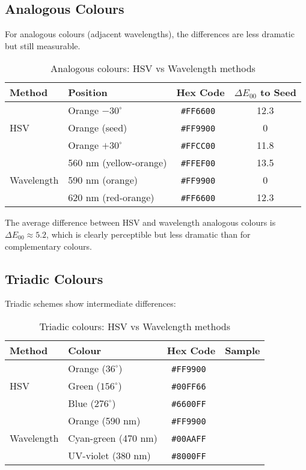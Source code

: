 \documentclass[12pt,a4paper]{article}
\newcommand{\deltaE}{\Delta E_{00}}
\newcommand{\hexcolour}[1]{%
  \definecolor{tempcolour}{HTML}{#1}%
  \texttt{\##1}~\raisebox{0.2ex}{\fboxsep=0pt\fbox{\colorbox{tempcolour}{\phantom{XX}}}}%
}
\begin{document}
\subsection{Analogous Colours}

For analogous colours (adjacent wavelengths), the differences are less dramatic but still measurable.

\begin{table}[ht]
\centering
\caption{Analogous colours: HSV vs Wavelength methods}
\label{tab:analogous}
\begin{tabular}{llcc}
\toprule
\textbf{Method} & \textbf{Position} & \textbf{Hex Code} & \textbf{$\deltaE$ to Seed} \\
\midrule
\multirow{3}{*}{HSV} & Orange $- 30^\circ$ & \hexcolour{FF6600} & 12.3 \\
& Orange (seed) & \hexcolour{FF9900} & 0 \\
& Orange $+ 30^\circ$ & \hexcolour{FFCC00} & 11.8 \\
\midrule
\multirow{3}{*}{Wavelength} & 560 nm (yellow-orange) & \hexcolour{FFEF00} & 13.5 \\
& 590 nm (orange) & \hexcolour{FF9900} & 0 \\
& 620 nm (red-orange) & \hexcolour{FF6600} & 12.3 \\
\bottomrule
\end{tabular}
\end{table}

The average difference between HSV and wavelength analogous colours is $\deltaE \approx 5.2$, which is clearly perceptible but less dramatic than for complementary colours.

\subsection{Triadic Colours}

Triadic schemes show intermediate differences:

\begin{table}[ht]
\centering
\caption{Triadic colours: HSV vs Wavelength methods}
\label{tab:triadic}
\begin{tabular}{llcc}
\toprule
\textbf{Method} & \textbf{Colour} & \textbf{Hex Code} & \textbf{Sample} \\
\midrule
\multirow{3}{*}{HSV} & Orange ($36^\circ$) & \hexcolour{FF9900} & \cellcolor{bitcoinorange}\phantom{XXX} \\
& Green ($156^\circ$) & \hexcolour{00FF66} & \cellcolor{green530!70!yellow570}\phantom{XXX} \\
& Blue ($276^\circ$) & \hexcolour{6600FF} & \cellcolor{violet410!70!blue470}\phantom{XXX} \\
\midrule
\multirow{3}{*}{Wavelength} & Orange (590 nm) & \hexcolour{FF9900} & \cellcolor{orange590}\phantom{XXX} \\
& Cyan-green (470 nm) & \hexcolour{00AAFF} & \cellcolor{blue470}\phantom{XXX} \\
& UV-violet (380 nm) & \hexcolour{8000FF} & \cellcolor{violet410!90}\phantom{XXX} \\
\bottomrule
\end{tabular}
\end{table}
\end{document}
